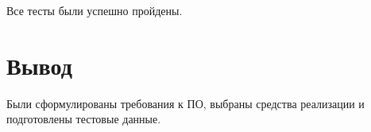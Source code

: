 Все тесты были успешно пройдены.
\section{Вывод}

Были сформулированы требования к ПО, выбраны средства реализации и подготовлены тестовые данные.
